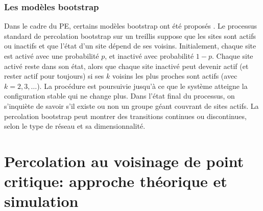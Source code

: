 \subsubsection{Les modèles bootstrap}
Dans le cadre du PE, certains modèles bootstrap ont été proposés \cite{Baxter-al2010}. Le processus standard de percolation bootstrap sur un treillis suppose que les sites sont actifs ou inactifs et que l'état d'un site dépend de ses voisins. Initialement, chaque site est activé avec une probabilité $p$, et inactivé avec probabilité $1-p$. Chaque site activé reste dans son état, alors que chaque site inactivé peut devenir actif (et rester actif pour toujours) si ses $k$ voisins les plus proches sont actifs (avec $k=2,3,\ldots$). La procédure est poursuivie jusqu'à ce que le système atteigne la configuration stable qui ne change plus. Dans l'état final du processus, on s'inquiète de savoir s'il existe ou non un groupe géant couvrant de sites actifs. La percolation bootstrap peut montrer des transitions continues ou discontinues, selon le type de réseau et sa dimensionnalité.
\begin{sloppypar}
	
\section{Percolation au voisinage de point critique: approche théorique et simulation}
\end{sloppypar}
